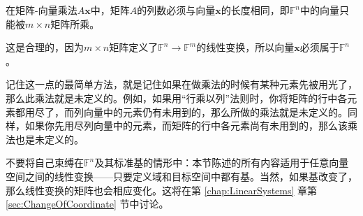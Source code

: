 \begin{remark*}
    在矩阵-向量乘法$A\mathbf{x}$中，矩阵$A$的列数必须与向量$\mathbf{x}$的长度相同，即$\mathbb{F}^n$中的向量只能被$m\times n$矩阵所乘。

    这是合理的，因为$m\times n$矩阵定义了$\mathbb{F}^n\to\mathbb{F}^m$的线性变换，所以向量$\mathbf{x}$必须属于$\mathbb{F}^n$。

    记住这一点的最简单方法，就是记住如果在做乘法的时候有某种元素先被用光了，那么此乘法就是未定义的。例如，如果用“行乘以列”法则时，你将矩阵的行中各元素都用尽了，而列向量中的元素仍有未用到的，那么所做的乘法就是未定义的。同样，如果你先用尽列向量中的元素，而矩阵的行中各元素尚有未用到的，那么该乘法也是未定义的。%
\end{remark*}

\begin{remark*}
    不要将自己束缚在$\mathbb{F}^n$及其标准基的情形中：本节陈述的所有内容适用于任意向量空间之间的线性变换——只要定义域和目标空间中都有基。当然，如果基改变了，那么线性变换的矩阵也会相应变化。这将在第 \ref{chap:LinearSystems} 章第 \ref{sec:ChangeOfCoordinate} 节中讨论。
\end{remark*}

